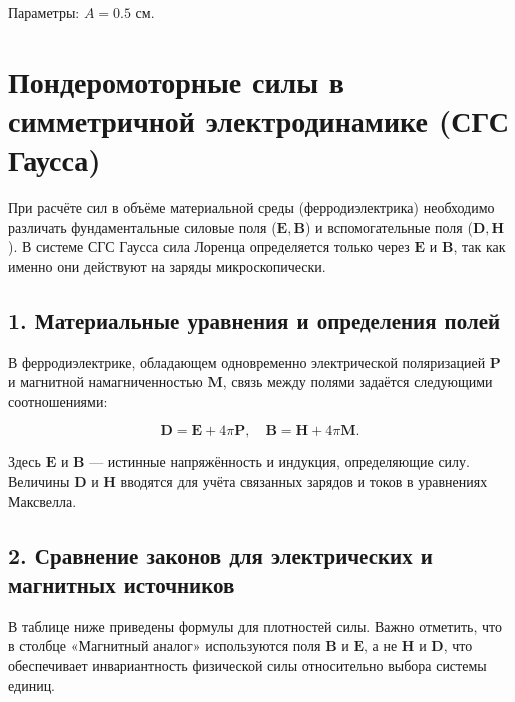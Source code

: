 \documentclass[a4paper,12pt]{article}
\begin{document}
Параметры: $A = 0.5$ см.


\section*{Пондеромоторные силы в симметричной электродинамике (СГС Гаусса)}

При расчёте сил в объёме материальной среды (ферродиэлектрика) необходимо различать фундаментальные силовые поля ($\mathbf{E}, \mathbf{B}$) и вспомогательные поля ($\mathbf{D}, \mathbf{H}$). В системе СГС Гаусса сила Лоренца определяется только через $\mathbf{E}$ и $\mathbf{B}$, так как именно они действуют на заряды микроскопически.

\subsection*{1. Материальные уравнения и определения полей}

В ферродиэлектрике, обладающем одновременно электрической поляризацией $\mathbf{P}$ и магнитной намагниченностью $\mathbf{M}$, связь между полями задаётся следующими соотношениями:

\begin{equation}
    \mathbf{D} = \mathbf{E} + 4\pi\mathbf{P}, \quad \mathbf{B} = \mathbf{H} + 4\pi\mathbf{M}.
    \label{eq:material_eq}
\end{equation}

Здесь $\mathbf{E}$ и $\mathbf{B}$ --- истинные напряжённость и индукция, определяющие силу. Величины $\mathbf{D}$ и $\mathbf{H}$ вводятся для учёта связанных зарядов и токов в уравнениях Максвелла.

\subsection*{2. Сравнение законов для электрических и магнитных источников}

В таблице ниже приведены формулы для плотностей силы. Важно отметить, что в столбце «Магнитный аналог» используются поля $\mathbf{B}$ и $\mathbf{E}$, а не $\mathbf{H}$ и $\mathbf{D}$, что обеспечивает инвариантность физической силы относительно выбора системы единиц.
\end{document}
